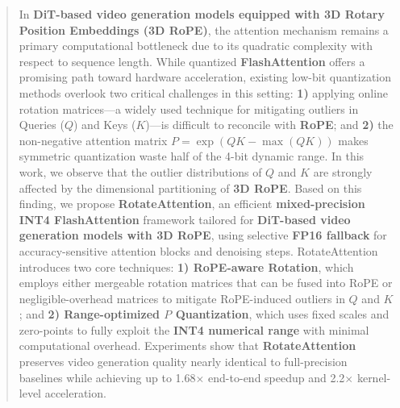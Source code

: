 
\begin{abstract}
In \textbf{DiT-based video generation models equipped with 3D Rotary Position Embeddings (3D RoPE)}, the attention mechanism remains a primary computational bottleneck due to its quadratic complexity with respect to sequence length. While quantized \textbf{FlashAttention} offers a promising path toward hardware acceleration, existing low-bit quantization methods overlook two critical challenges in this setting: \textbf{1)} applying online rotation matrices---a widely used technique for mitigating outliers in Queries ($Q$) and Keys ($K$)---is difficult to reconcile with \textbf{RoPE}; and \textbf{2)} the non-negative attention matrix $P = \exp(QK - \max(QK))$ makes symmetric quantization waste half of the 4-bit dynamic range. In this work, we observe that the outlier distributions of $Q$ and $K$ are strongly affected by the dimensional partitioning of \textbf{3D RoPE}. Based on this finding, we propose \textbf{RotateAttention}, an efficient \textbf{mixed-precision INT4 FlashAttention} framework tailored for \textbf{DiT-based video generation models with 3D RoPE}, using selective \textbf{FP16 fallback} for accuracy-sensitive attention blocks and denoising steps. RotateAttention introduces two core techniques: \textbf{1) RoPE-aware Rotation}, which employs either mergeable rotation matrices that can be fused into RoPE or negligible-overhead matrices to mitigate RoPE-induced outliers in $Q$ and $K$; and \textbf{2) Range-optimized $P$ Quantization}, which uses fixed scales and zero-points to fully exploit the \textbf{INT4 numerical range} with minimal computational overhead. 
Experiments show that \textbf{RotateAttention} preserves video generation quality nearly identical to full-precision baselines while achieving up to 1.68$\times$ end-to-end speedup and 2.2$\times$ kernel-level acceleration.

\end{abstract}


